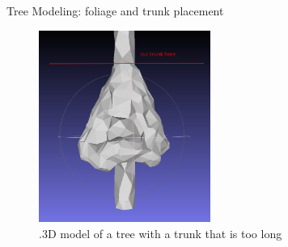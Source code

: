 \documentclass[10pt]{beamer}
\begin{document}
  \begin{frame}{Tree Modeling: foliage and trunk placement}
	\begin{figure}
		\centering
		\includegraphics[width=0.5\textwidth]{images/trunk_cut.png}
		\caption{.3D model of a tree with a trunk that is too long}
		\label{fig:figure1}
	\end{figure}
\end{frame}
\end{document}
